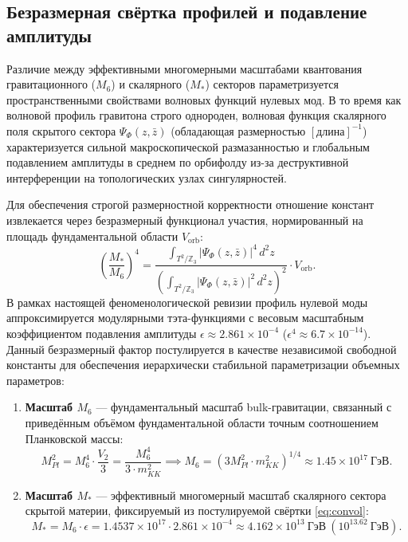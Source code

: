 \documentclass[12pt,a4paper]{article}
\begin{document}
\subsection{Безразмерная свёртка профилей и подавление амплитуды}
Различие между эффективными многомерными масштабами квантования гравитационного ($M_6$) и скалярного ($M_*$) секторов параметризуется пространственными свойствами волновых функций нулевых мод. В то время как волновой профиль гравитона строго однороден, волновая функция скалярного поля скрытого сектора $\Psi_{\Phi}(z,\bar{z})$ (обладающая размерностью $[\text{длина}]^{-1}$) характеризуется сильной макроскопической размазанностью и глобальным подавлением амплитуды в среднем по орбифолду из-за деструктивной интерференции на топологических узлах сингулярностей.

Для обеспечения строгой размерностной корректности отношение констант извлекается через безразмерный функционал участия, нормированный на площадь фундаментальной области $V_{\text{orb}}$:
\begin{equation}
\left(\frac{M_*}{M_6}\right)^4 = \frac{\int_{T^2/\mathbb{Z}_3} |\Psi_{\Phi}(z,\bar{z})|^4 \, d^2z}{\left( \int_{T^2/\mathbb{Z}_3} |\Psi_{\Phi}(z,\bar{z})|^2 \, d^2z \right)^2} \cdot V_{\text{orb}}.
\label{eq:convol}
\end{equation}
В рамках настоящей феноменологической ревизии профиль нулевой моды аппроксимируется модулярными тэта-функциями с весовым масштабным коэффициентом подавления амплитуды $\epsilon \approx 2.861 \times 10^{-4}$ ($\epsilon^4 \approx 6.7 \times 10^{-14}$). Данный безразмерный фактор постулируется в качестве независимой свободной константы для обеспечения иерархически стабильной параметризации объемных параметров:
\begin{enumerate}
\item \textbf{Масштаб $M_6$} --- фундаментальный масштаб bulk-гравитации, связанный с приведённым объёмом фундаментальной области точным соотношением Планковской массы:
\begin{equation}
M_{Pl}^2 = M_6^4 \cdot \frac{V_2}{3} = \frac{M_6^4}{3 \cdot m_{KK}^2} \implies M_6 = \left(3 M_{Pl}^2 \cdot m_{KK}^2\right)^{1/4} \approx 1.45 \times 10^{17} \ \text{ГэВ}.
\end{equation}
\item \textbf{Масштаб $M_*$} --- эффективный многомерный масштаб скалярного сектора скрытой материи, фиксируемый из постулируемой свёртки \eqref{eq:convol}:
\begin{equation}
M_* = M_6 \cdot \epsilon = 1.4537 \times 10^{17} \cdot 2.861 \times 10^{-4} \approx 4.162 \times 10^{13} \ \text{ГэВ} \ (10^{13.62} \ \text{ГэВ}).
\end{equation}
\end{enumerate}
\end{document}
